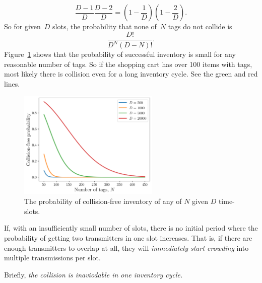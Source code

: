 \documentclass[12pt]{article}
\begin{document}
\[
\frac{D-1}{D} \frac{D-2}{D} = \left(1-\frac{1}{D}\right) \left(1- \frac{2}{D}\right).
\] 
So for given~$D$ slots,  the probability that none of~$N$ tags do not collide is
\[
\frac{D!}{D^N(D-N)!}.
\] 
Figure~\ref{fig:pr_collision-free} shows that the probability of successful inventory is small for any reasonable number of tags. So if the shopping cart has over 100 items with tags, most likely there is collision even for a long inventory cycle. See the green and red lines. 
\begin{figure}[!tb]
\centering
\includegraphics[width=0.6\textwidth]{fig_collision_free}
\caption{The probability of collision-free inventory of any of $N$ given $D$ time-slots.}
\label{fig:pr_collision-free}
\end{figure}

If, with an insufficiently small number of slots, there is no initial period where the probability of getting two transmitters in one slot increases. That is, if there are enough transmitters to overlap at all, they will \emph{immediately start crowding} into multiple transmissions per slot.

Briefly, \emph{the collision is inaviodable in one inventory cycle.}
\end{document}
